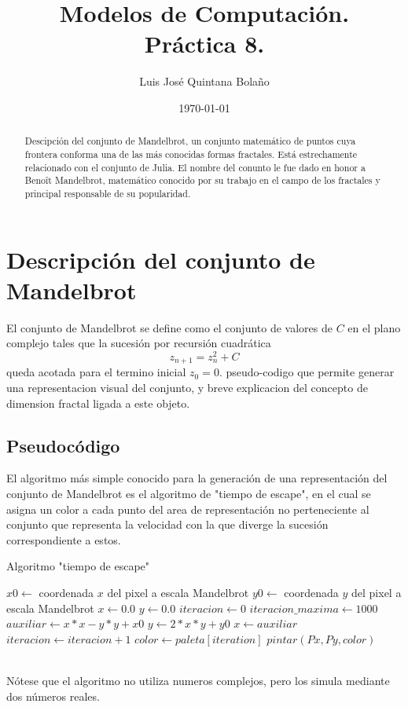 \documentclass[a4paper]{article}
\title{Modelos de Computación.\\ Práctica 8. }
\author{Luis José Quintana Bolaño}
\date{\today}
\begin{document}
	\maketitle
	\begin{abstract}
	    Descipción del conjunto de Mandelbrot, un conjunto matemático de puntos cuya frontera conforma una de las más conocidas formas fractales. Está estrechamente relacionado con el conjunto de Julia. El nombre del conunto le fue dado en honor a Benoît Mandelbrot, matemático conocido por su trabajo en el campo de los fractales y principal responsable de su popularidad.
  	\end{abstract}
	\section{Descripción del conjunto de Mandelbrot}
		El conjunto de Mandelbrot se define como el conjunto de valores de $C$ en el plano complejo tales que la sucesión por recursión cuadrática
		$$z_{n+1} = z^2_n + C$$
		queda acotada para el termino inicial $z_0 = 0$.
		 pseudo-codigo que permite generar una representacion
visual del conjunto, y breve explicacion del concepto de dimension fractal
ligada a este objeto. 
	\subsection{Pseudocódigo}
		El algoritmo más simple conocido para la generación de una representación del conjunto de Mandelbrot es el algoritmo de "tiempo de escape", en el cual se asigna un color a cada punto del area de representación no perteneciente al conjunto que representa la velocidad con la que diverge la sucesión correspondiente a estos. 
		\begin{algorithm}
			\caption{Algoritmo "tiempo de escape"}
			\begin{algorithmic}[1]
				\State $x0 \gets$ coordenada $x$ del pixel a escala Mandelbrot
  				\State $y0 \gets$ coordenada $y$ del pixel a escala Mandelbrot
  				\State $x \gets 0.0$
  				\State $y \gets 0.0$
  				\State $iteracion \gets 0$
				\State $iteracion\_maxima \gets 1000$
					\State $auxiliar \gets x*x - y*y + x0$
    				\State $y \gets 2*x*y + y0$
    				\State $x \gets auxiliar$
    				\State $iteracion \gets iteracion + 1$
				\EndWhile
				\State $color \gets paleta[iteration]$
  				\State $pintar(Px, Py, color)$
			\EndFor
			\end{algorithmic}
		\end{algorithm}			
	\\Nótese que el algoritmo no utiliza numeros complejos, pero los simula mediante dos números reales.
	\newpage
\end{document}
